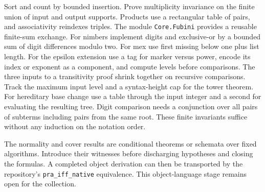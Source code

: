 \begin{enumerate}[leftmargin=*,label=\arabic*.]
Sort and count by bounded insertion. Prove multiplicity invariance on the finite union of input and output supports. Products use a rectangular table of pairs, and associativity reindexes triples. The module \texttt{Core.Fubini} provides a reusable finite-sum exchange. For nimbers implement digits and exclusive-or by a bounded sum of digit differences modulo two. For mex use first missing below one plus list length. For the epsilon extension use a tag for marker versus power, encode its index or exponent as a component, and compute levels before comparisons. The three inputs to a transitivity proof shrink together on recursive comparisons. Track the maximum input level and a syntax-height cap for the tower theorem. For hereditary base change use a table through the input integer and a second for evaluating the resulting tree. Digit comparison needs a conjunction over all pairs of subterms including pairs from the same root. These finite invariants suffice without any induction on the notation order.
\end{enumerate}
The normality and cover results are conditional theorems or schemata over fixed algorithms. Introduce their witnesses before discharging hypotheses and closing the formulas. A completed object derivation can then be transported by the repository's \texttt{pra\_iff\_native} equivalence. This object-language stage remains open for the collection.


